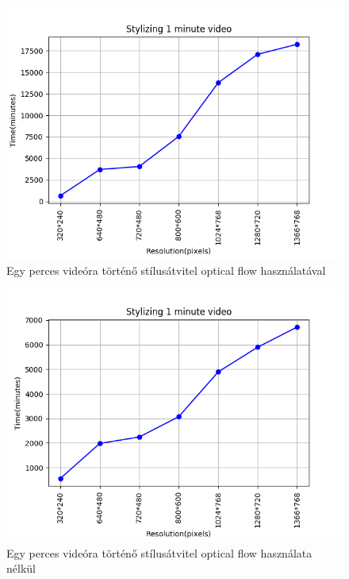 \documentclass[12pt, a4paper, oneside]{book}
\theoremstyle{tetel}
\begin{document}
\begin{figure}[!htbp]
\begin{center}
	\includegraphics[scale=0.8]{one_min_video_opt_flow.png}
	\caption{Egy perces videóra történő stílusátvitel optical flow használatával}
	\label{one_min_video_opt_flow}
\end{center}
\end{figure} 
 
\begin{figure}[!htbp]
	\begin{center}
		\includegraphics[scale=0.8]{one_min_video.png}
		\caption{Egy perces videóra történő stílusátvitel optical flow használata nélkül}
		\label{one_min_video}
	\end{center}
\end{figure} 
\end{document}
